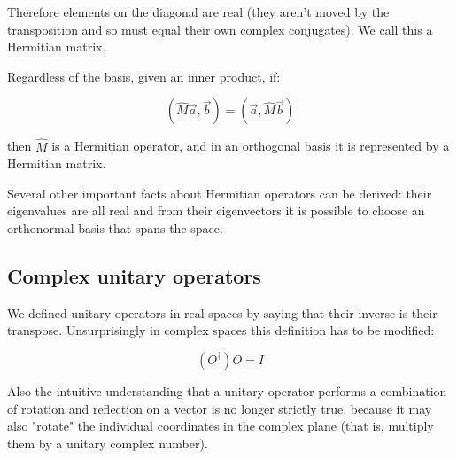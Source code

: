 Therefore elements on the diagonal are real (they aren't moved by the transposition and so must equal their own complex conjugates). We call this a Hermitian matrix.

Regardless of the basis, given an inner product, if:

$$(\hat{M} \vec{a}, \vec{b}) = (\vec{a}, \hat{M} \vec{b})$$

then $\hat{M}$ is a Hermitian operator, and in an orthogonal basis it is represented by a Hermitian matrix.

Several other important facts about Hermitian operators can be derived: their eigenvalues are all real and from their eigenvectors it is possible to choose an orthonormal basis that spans the space.

\subsection{Complex unitary operators}

We defined unitary operators in real spaces by saying that their inverse is their transpose. Unsurprisingly in complex spaces this definition has to be modified:

$$(O^\dagger) O = I$$

Also the intuitive understanding that a unitary operator performs a combination of rotation and reflection on a vector is no longer strictly true, because it may also "rotate" the individual coordinates in the complex plane (that is, multiply them by a unitary complex number).
